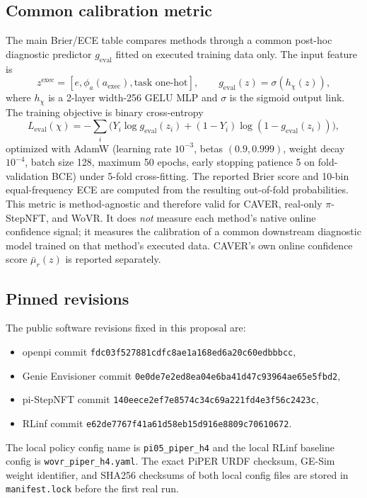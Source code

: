 \documentclass[10pt]{article}
\theoremstyle{plain}
\theoremstyle{definition}
\theoremstyle{remark}
\begin{document}
\subsection{Common calibration metric}
The main Brier/ECE table compares methods through a common post-hoc diagnostic predictor $g_{\mathrm{eval}}$ fitted on executed training data only. The input feature is
\[
z^{\mathrm{exec}}=[e,\phi_a(a_{\mathrm{exec}}),\text{task one-hot}],
\qquad
g_{\mathrm{eval}}(z)=\sigma(h_{\chi}(z)),
\]
where $h_{\chi}$ is a 2-layer width-256 GELU MLP and $\sigma$ is the sigmoid output link. The training objective is binary cross-entropy
\[
L_{\mathrm{eval}}(\chi)=
-\sum_i\Big(Y_i\log g_{\mathrm{eval}}(z_i)+(1-Y_i)\log(1-g_{\mathrm{eval}}(z_i))\Big),
\]
optimized with AdamW (learning rate $10^{-3}$, betas $(0.9,0.999)$, weight decay $10^{-4}$, batch size 128, maximum 50 epochs, early stopping patience 5 on fold-validation BCE) under 5-fold cross-fitting. The reported Brier score and 10-bin equal-frequency ECE are computed from the resulting out-of-fold probabilities. This metric is method-agnostic and therefore valid for CAVER, real-only $\pi$-StepNFT, and WoVR. It does \emph{not} measure each method's native online confidence signal; it measures the calibration of a common downstream diagnostic model trained on that method's executed data. CAVER's own online confidence score $\bar\mu_r(z)$ is reported separately.

\subsection{Pinned revisions}
The public software revisions fixed in this proposal are:
\begin{itemize}
    \item openpi commit \texttt{fdc03f527881cdfc8ae1a168ed6a20c60edbbbcc},
    \item Genie Envisioner commit \texttt{0e0de7e2ed8ea04e6ba41d47c93964ae65e5fbd2},
    \item pi-StepNFT commit \texttt{140eece2ef7e8574c34c69a221fd4e3f56c2423c},
    \item RLinf commit \texttt{e62de7767f41a61d58eb15d916e8809c70610672}.
\end{itemize}
The local policy config name is \texttt{pi05\_piper\_h4} and the local RLinf baseline config is \texttt{wovr\_piper\_h4.yaml}. The exact PiPER URDF checksum, GE-Sim weight identifier, and SHA256 checksums of both local config files are stored in \texttt{manifest.lock} before the first real run.
\end{document}
